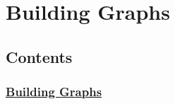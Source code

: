 

\section{Building Graphs} \label{building-graphs}

\subsection{Contents}\label{contents}

\subsubsection{\texorpdfstring{\protect\hyperlink{AUTOGENERATED-building-graphs}{Building
Graphs}}{Building Graphs}}\label{building-graphs-1}

